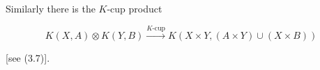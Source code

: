 Similarly there is the $K$-cup product

$$K(X, A) \otimes K(Y, B) \xrightarrow{K\text{-cup}} K(X \times Y, (A \times Y) \cup (X \times B))$$

[see (3.7)].
